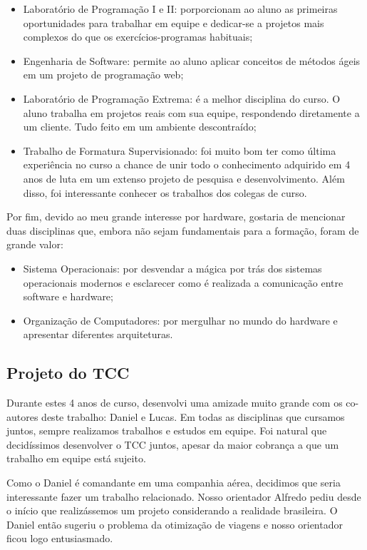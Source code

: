 \begin{itemize}
	\item Laboratório de Programação I e II: porporcionam ao aluno as primeiras oportunidades
	para trabalhar em equipe e dedicar-se a projetos mais complexos do que os
	exercícios-programas habituais;
	\item Engenharia de Software: permite ao aluno aplicar conceitos de métodos ágeis em um
	projeto de programação web;
	\item Laboratório de Programação Extrema: é a melhor disciplina do curso. O aluno trabalha
	em projetos reais com sua equipe, respondendo diretamente a um cliente. Tudo feito em um
	ambiente descontraído;
	\item Trabalho de Formatura Supervisionado: foi muito bom ter como última experiência no
	curso a chance de unir todo o conhecimento adquirido em 4 anos de luta em um extenso projeto
	de pesquisa e desenvolvimento. Além disso, foi interessante conhecer os trabalhos dos
	colegas	de curso.
\end{itemize}

Por fim, devido ao meu grande interesse por hardware, gostaria de mencionar duas disciplinas que,
embora não sejam fundamentais para a formação, foram de grande valor:

\begin{itemize}
	\item Sistema Operacionais: por desvendar a mágica por trás dos sistemas operacionais
	modernos e esclarecer como é realizada a comunicação entre software e hardware;
	\item Organização de Computadores: por mergulhar no mundo do hardware e apresentar 
	diferentes arquiteturas.
\end{itemize} 

\subsection{Projeto do TCC}

Durante estes 4 anos de curso, desenvolvi uma amizade muito grande com os co-autores deste trabalho:
Daniel e Lucas. Em todas as disciplinas que cursamos juntos, sempre realizamos trabalhos e estudos
em equipe. Foi natural que decidíssimos desenvolver o TCC juntos, apesar da maior cobrança a que um
trabalho em equipe está sujeito.

Como o Daniel é comandante em uma companhia aérea, decidimos que seria interessante fazer um
trabalho relacionado. Nosso orientador Alfredo pediu desde o início que realizássemos um projeto
considerando a realidade brasileira. O Daniel então sugeriu o problema da otimização de viagens e
nosso orientador ficou logo entusiasmado.

